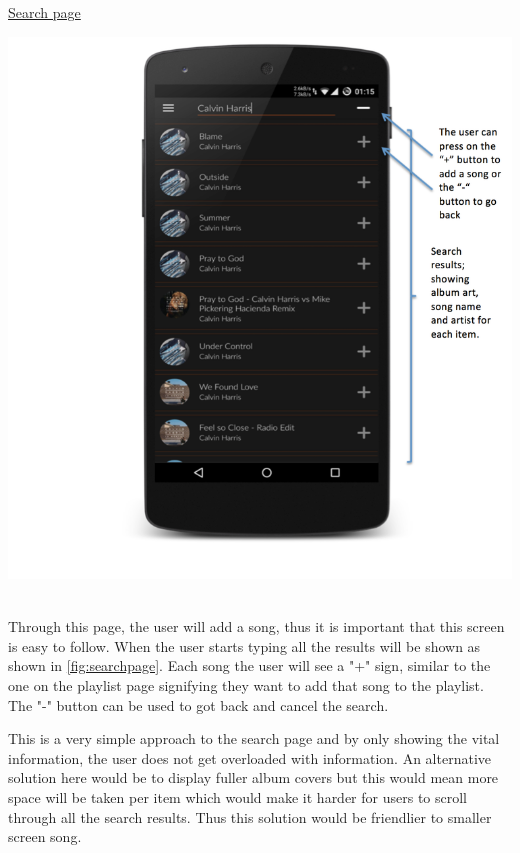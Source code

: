 \newpage


\noindent\underline{Search page}\newline

\noindent
\begin{minipage}{\linewidth}
\centering
\includegraphics[scale=1]{./img/searchannotated.png}
\label{fig:searchpage}
\end{minipage}\\

Through this page, the user will add a song, thus it is important that this screen is easy to follow. When the user starts typing all the results will be shown as shown in \ref{fig:searchpage}. Each song the user will see a "+" sign, similar to the one on the playlist page signifying they want to add that song to the playlist. The "-" button can be used to got back and cancel the search. 

This is a very simple approach to the search page and by only showing the vital information, the user does not get overloaded with information. An alternative solution here would be to display fuller album covers but this would mean more space will be taken per item which would make it harder for users to scroll through all the search results. Thus this solution would be friendlier to smaller screen song.

